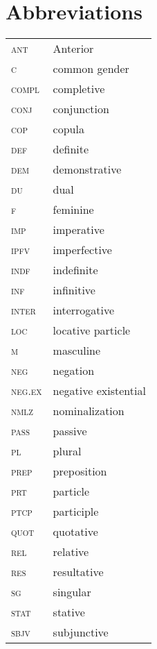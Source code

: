 \documentclass[output=paper]{langsci/langscibook}
\begin{document}
\section*{Abbreviations}
\begin{tabularx}{.45\textwidth}{lQ}
\textsc{ant} & Anterior\\
\textsc{c} & common gender\\
\textsc{compl} & completive\\
\textsc{conj} & conjunction\\
\textsc{cop} & copula\\
\textsc{def}	 & definite\\
\textsc{dem} & demonstrative\\
\textsc{du} & dual\\
\textsc{f} & feminine\\
\textsc{imp} & imperative\\
\textsc{ipfv} & imperfective\\
\textsc{indf} & indefinite\\
\textsc{inf} & infinitive\\
\textsc{inter} & interrogative\\
\textsc{loc} & locative particle\\
\textsc{m} & masculine\\
\textsc{neg} & negation\\
\textsc{neg.ex} & negative existential\\ 
\textsc{nmlz} &	nominalization\\	
\textsc{pass	} & passive\\
\textsc{pl} & plural\\	
\textsc{prep	} & preposition\\
\textsc{prt	} & particle\\
\textsc{ptcp} & participle\\
\textsc{quot} & 	quotative\\
\textsc{rel} & relative\\
\textsc{res} & resultative\\
\textsc{sg} & singular\\
\textsc{stat} & stative\\
\textsc{sbjv} & subjunctive\\
\end{tabularx}
\end{document}
